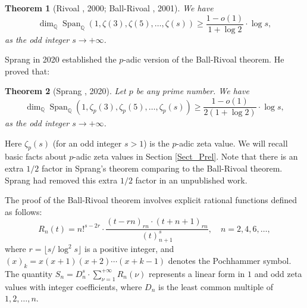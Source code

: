 \documentclass[12pt]{article}
\newtheorem*{theorem*}{Theorem}
\numberwithin{equation}{section}
\begin{document}
\begin{theorem*}[Rivoal \cite{Riv2000}, 2000;  Ball-Rivoal \cite{BR2001}, 2001]
We have
\[ \dim_\mathbb{Q}\operatorname{Span}_{\mathbb{Q}}\left( 1,\zeta(3),\zeta(5),\ldots,\zeta(s) \right) \geqslant \frac{1-o(1)}{1+\log 2} \cdot \log s, \]
as the odd integer $s \to +\infty$.  
\end{theorem*}

Sprang in 2020 established the $p$-adic version of the Ball-Rivoal theorem. He proved that: 

\begin{theorem*}[Sprang \cite{Spr20}, 2020]
Let $p$ be any prime number. We have
\[ \dim_\mathbb{Q}\operatorname{Span}_{\mathbb{Q}}\left( 1,\zeta_p(3),\zeta_p(5),\ldots,\zeta_p(s) \right) \geqslant \frac{1-o(1)}{2(1+\log 2)} \cdot \log s, \]
as the odd integer $s \to +\infty$.  
\end{theorem*}

Here $\zeta_p(s)$ (for an odd integer $s>1$) is the $p$-adic zeta value. We will recall basic facts about $p$-adic zeta values in Section \ref{Sect_Prel}. Note that there is an extra $1/2$ factor in Sprang's theorem comparing to the Ball-Rivoal theorem. Sprang had removed this extra $1/2$ factor in an unpublished work.

\medskip

The proof of the Ball-Rivoal theorem involves explicit rational functions defined as follows:
\[ R_n(t) = n!^{s-2r} \cdot \frac{(t-rn)_{rn} \cdot (t+n+1)_{rn}}{(t)_{n+1}^{s}}, \quad n=2,4,6,\ldots, \]
where $r=\lfloor s/\log^2 s\rfloor$ is a positive integer, and $(x)_{k}=x(x+1)(x+2)\cdots(x+k-1)$ denotes the Pochhammer symbol. The quantity $S_n = D_n^{s} \cdot \sum_{\nu=1}^{+\infty} R_n(\nu)$ represents a linear form in $1$ and odd zeta values with integer coefficients, where $D_n$ is the least common multiple of $1,2,\ldots,n$. 
\end{document}
